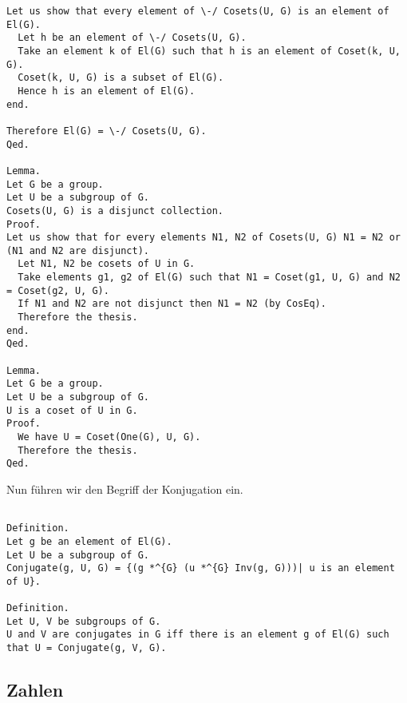 \documentclass[a4paper,12pt]{scrartcl}
\begin{document}
\begin{lstlisting}
Let us show that every element of \-/ Cosets(U, G) is an element of El(G).
  Let h be an element of \-/ Cosets(U, G).
  Take an element k of El(G) such that h is an element of Coset(k, U, G).
  Coset(k, U, G) is a subset of El(G).
  Hence h is an element of El(G).
end.

Therefore El(G) = \-/ Cosets(U, G).
Qed.

Lemma.
Let G be a group.
Let U be a subgroup of G.
Cosets(U, G) is a disjunct collection.
Proof.
Let us show that for every elements N1, N2 of Cosets(U, G) N1 = N2 or (N1 and N2 are disjunct).
  Let N1, N2 be cosets of U in G.
  Take elements g1, g2 of El(G) such that N1 = Coset(g1, U, G) and N2 = Coset(g2, U, G).
  If N1 and N2 are not disjunct then N1 = N2 (by CosEq).
  Therefore the thesis.
end.
Qed.

Lemma.
Let G be a group.
Let U be a subgroup of G.
U is a coset of U in G.
Proof.
  We have U = Coset(One(G), U, G).
  Therefore the thesis.
Qed.

\end{lstlisting}

Nun führen wir den Begriff der Konjugation ein.

\begin{lstlisting}

Definition.
Let g be an element of El(G).
Let U be a subgroup of G.
Conjugate(g, U, G) = {(g *^{G} (u *^{G} Inv(g, G)))| u is an element of U}.

Definition.
Let U, V be subgroups of G.
U and V are conjugates in G iff there is an element g of El(G) such that U = Conjugate(g, V, G).

\end{lstlisting}

\subsection{Zahlen}
\end{document}

